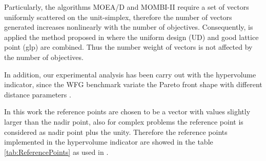 
Particularly, the algorithms MOEA/D and MOMBI-II require a set of vectors uniformly scattered on the unit-simplex, therefore the number of vectors generated increases nonlinearly with the number of objectives.
%
Consequently, is applied the method proposed in \cite{Joel:MOEAD_Uniform_Design, Joel:Kuhn_Munkres} where the uniform design (UD) \cite{Joel:Uniform_Design} and good lattice point (glp) are combined.
%
Thus the number weight of vectors is not affected by the number of objectives.

In addition, our experimental analysis has been carry out with the hypervolume indicator, since the WFG benchmark variate the Pareto front shape with different distance parameters \cite{Joel:ScalabilityStudy}.
%

In this work the reference points are chosen to be a vector with values slightly larger than the nadir point, also for complex problems the reference point is considered as nadir point plus the unity.
%
Therefore the reference points implemented in the hypervolume indicator are showed in the table \ref{tab:ReferencePoints} as used in \cite{Joel:Kuhn_Munkres, Joel:OperatorAHX}.


